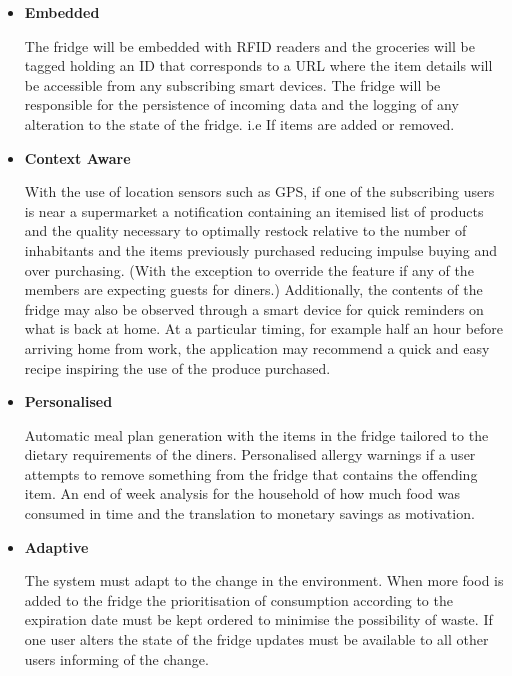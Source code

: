 \documentclass[a4paper, 11pt]{article}
\begin{document}
\vspace{\baselineskip}
\begin{itemize}
    \setlength{\parskip}{-0.5em}
  \item[] \textbf{Embedded}
  \begin{flushleft}\justify The fridge will be embedded with RFID readers and the groceries will be tagged holding an ID that corresponds to a URL where the item details will be accessible from any subscribing smart devices. The fridge will be responsible for the persistence of incoming data and the logging of any alteration to the state of the fridge. i.e If items are added or removed.
  \end{flushleft}
  \vspace{\baselineskip}

  \item[] \textbf{Context Aware} 
    \begin{flushleft}\justify With the use of location sensors such as GPS, if one of the subscribing users is near a supermarket a notification containing an itemised list of products and the quality necessary to optimally restock relative to the number of inhabitants and the items previously purchased reducing impulse buying and over purchasing. (With the exception to override the feature if any of the members are expecting guests for diners.) Additionally, the contents of the fridge may also be observed through a smart device for quick reminders on what is back at home. At a particular timing, for example half an hour before arriving home from work, the application may recommend a quick and easy recipe inspiring the use of the produce purchased.
\end{flushleft}
\vspace{\baselineskip}

  \item[] \textbf{Personalised} 
    \begin{flushleft}\justify Automatic meal plan generation with the items in the fridge tailored to the dietary requirements of the diners. Personalised allergy warnings if a user attempts to remove something from the fridge that contains the offending item. An end of week analysis for the household of how much food was consumed in time and the translation to monetary savings as motivation.
\end{flushleft}
\vspace{\baselineskip}

  \item[] \textbf{Adaptive} 
    \begin{flushleft}\justify The system must adapt to the change in the environment. When more food is added to the fridge the prioritisation of consumption according to the expiration date must be kept ordered to minimise the possibility of waste. If one user alters the state of the fridge updates must be available to all other users informing of the change.
\end{flushleft}
\vspace{\baselineskip}
 \clearpage


\end{itemize}
\end{document}
